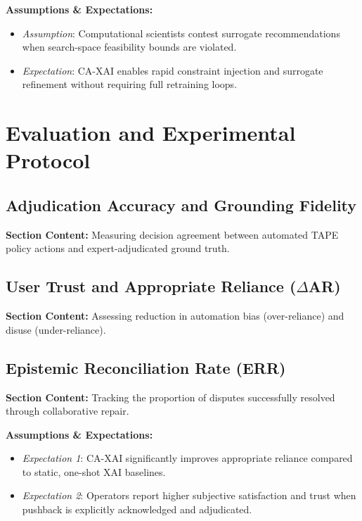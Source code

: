 \documentclass[preprint,12pt,3p,times]{elsarticle}
\begin{document}
\textbf{Assumptions \& Expectations:}
\begin{itemize}
    \item \emph{Assumption}: Computational scientists contest surrogate recommendations when search-space feasibility bounds are violated.
    \item \emph{Expectation}: CA-XAI enables rapid constraint injection and surrogate refinement without requiring full retraining loops.
\end{itemize}

\section{Evaluation and Experimental Protocol}
\label{sec:evaluation}

\subsection{Adjudication Accuracy and Grounding Fidelity}
\textbf{Section Content:} Measuring decision agreement between automated TAPE policy actions and expert-adjudicated ground truth.

\subsection{User Trust and Appropriate Reliance ($\Delta$AR)}
\textbf{Section Content:} Assessing reduction in automation bias (over-reliance) and disuse (under-reliance).

\subsection{Epistemic Reconciliation Rate (ERR)}
\textbf{Section Content:} Tracking the proportion of disputes successfully resolved through collaborative repair.

\textbf{Assumptions \& Expectations:}
\begin{itemize}
    \item \emph{Expectation 1}: CA-XAI significantly improves appropriate reliance compared to static, one-shot XAI baselines.
    \item \emph{Expectation 2}: Operators report higher subjective satisfaction and trust when pushback is explicitly acknowledged and adjudicated.
\end{itemize}
\end{document}
